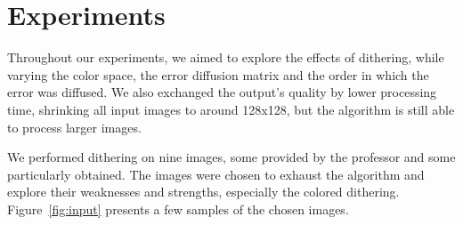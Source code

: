 \documentclass[conference]{IEEEtran}
\begin{document}
\section{Experiments}
Throughout our experiments, we aimed to explore the effects of dithering, while varying the color space, the error diffusion matrix and the order in which the error was diffused. We also exchanged the output's quality by lower processing time, shrinking all input images to around 128x128, but the algorithm is still able to process larger images.\par
We performed dithering on nine images, some provided by the professor and some particularly obtained. The images were chosen to exhaust the algorithm and explore their weaknesses and strengths, especially the colored dithering. Figure~\ref{fig:input} presents a few samples of the chosen images.
\end{document}
